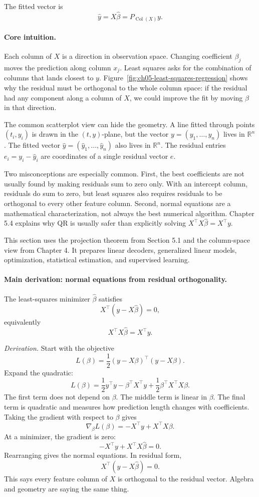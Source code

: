 The fitted vector is
\[
\hat y=X\hat\beta=P_{\operatorname{Col}(X)}y.
\]

\paragraph{Core intuition.}
Each column of \(X\) is a direction in observation space. Changing coefficient \(\beta_j\) moves the prediction along column \(x_j\). Least squares asks for the combination of columns that lands closest to \(y\). Figure~\ref{fig:ch05-least-squares-regression} shows why the residual must be orthogonal to the whole column space: if the residual had any component along a column of \(X\), we could improve the fit by moving \(\beta\) in that direction.

The common scatterplot view can hide the geometry. A line fitted through points \((t_i,y_i)\) is drawn in the \((t,y)\)-plane, but the vector \(y=(y_1,\dots,y_n)\) lives in \(\mathbb{R}^n\). The fitted vector \(\hat y=(\hat y_1,\dots,\hat y_n)\) also lives in \(\mathbb{R}^n\). The residual entries \(e_i=y_i-\hat y_i\) are coordinates of a single residual vector \(e\).

Two misconceptions are especially common. First, the best coefficients are not usually found by making residuals sum to zero only. With an intercept column, residuals do sum to zero, but least squares also requires residuals to be orthogonal to every other feature column. Second, normal equations are a mathematical characterization, not always the best numerical algorithm. Chapter 5.4 explains why QR is usually safer than explicitly solving \(X^\top X\hat\beta=X^\top y\).

This section uses the projection theorem from Section 5.1 and the column-space view from Chapter 4. It prepares linear decoders, generalized linear models, optimization, statistical estimation, and supervised learning.

\paragraph{Main derivation: normal equations from residual orthogonality.}
The least-squares minimizer \(\hat\beta\) satisfies
\[
X^\top(y-X\hat\beta)=0,
\]
equivalently
\[
X^\top X\hat\beta=X^\top y.
\]

\emph{Derivation.} Start with the objective
\[
L(\beta)=\frac12(y-X\beta)^\top(y-X\beta).
\]
Expand the quadratic:
\[
L(\beta)=\frac12 y^\top y-\beta^\top X^\top y+\frac12\beta^\top X^\top X\beta.
\]
The first term does not depend on \(\beta\). The middle term is linear in \(\beta\). The final term is quadratic and measures how prediction length changes with coefficients. Taking the gradient with respect to \(\beta\) gives
\[
\nabla_\beta L(\beta)=-X^\top y+X^\top X\beta.
\]
At a minimizer, the gradient is zero:
\[
-X^\top y+X^\top X\hat\beta=0.
\]
Rearranging gives the normal equations. In residual form,
\[
X^\top(y-X\hat\beta)=0.
\]
This says every feature column of \(X\) is orthogonal to the residual vector. Algebra and geometry are saying the same thing.

